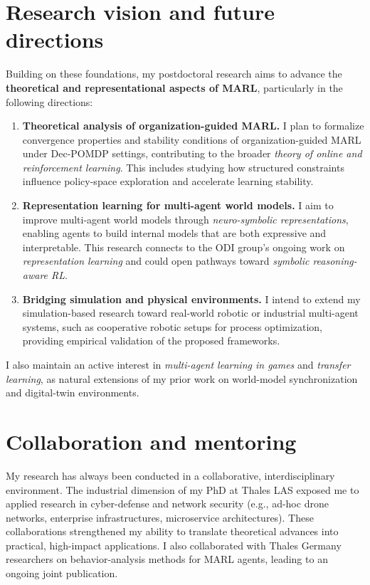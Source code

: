 \documentclass[11pt,a4paper,sans]{moderncv}
\begin{document}
\section*{Research vision and future directions}

Building on these foundations, my postdoctoral research aims to advance the \textbf{theoretical and representational aspects of MARL}, particularly in the following directions:

\begin{enumerate}
      \item \textbf{Theoretical analysis of organization-guided MARL.}
            I plan to formalize convergence properties and stability conditions of organization-guided MARL under Dec-POMDP settings, contributing to the broader \emph{theory of online and reinforcement learning}. This includes studying how structured constraints influence policy-space exploration and accelerate learning stability.

      \item \textbf{Representation learning for multi-agent world models.}
            I aim to improve multi-agent world models through \emph{neuro-symbolic representations}, enabling agents to build internal models that are both expressive and interpretable. This research connects to the ODI group's ongoing work on \emph{representation learning} and could open pathways toward \emph{symbolic reasoning-aware RL}.

      \item \textbf{Bridging simulation and physical environments.}
            I intend to extend my simulation-based research toward real-world robotic or industrial multi-agent systems, such as cooperative robotic setups for process optimization, providing empirical validation of the proposed frameworks.
\end{enumerate}

I also maintain an active interest in \emph{multi-agent learning in games} and \emph{transfer learning}, as natural extensions of my prior work on world-model synchronization and digital-twin environments.

\section*{Collaboration and mentoring}

My research has always been conducted in a collaborative, interdisciplinary environment.
The industrial dimension of my PhD at Thales LAS exposed me to applied research in cyber-defense and network security (e.g., ad-hoc drone networks, enterprise infrastructures, microservice architectures).
These collaborations strengthened my ability to translate theoretical advances into practical, high-impact applications.
I also collaborated with Thales Germany researchers on behavior-analysis methods for MARL agents, leading to an ongoing joint publication.
\end{document}
